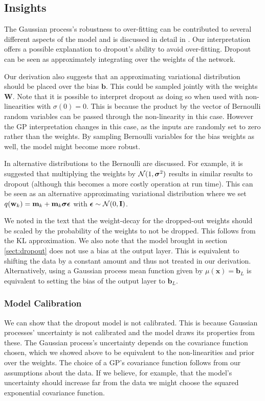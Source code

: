 \documentclass{article} %
\newcommand{\N}{\mathcal{N}}
\newcommand{\x}{\mathbf{x}}
\newcommand{\Bb}{\mathbf{b}}
\newcommand{\w}{\mathbf{w}}
\newcommand{\W}{\mathbf{W}}
\newcommand{\m}{\mathbf{m}}
\newcommand{\I}{\mathbf{I}}
\newcommand{\bepsilon}{\text{\boldmath$\epsilon$}}
\newcommand{\bsigma}{\text{\boldmath$\sigma$}}
\theoremstyle{definition}
\begin{document}
\subsection{Insights}
The Gaussian process's robustness to over-fitting can be contributed to several different aspects of the model and is discussed in detail in \citep{Rasmussen2005Gaussian}. 
Our interpretation offers a possible explanation to dropout's ability to avoid over-fitting. Dropout can be seen as approximately integrating over the weights of the network.

Our derivation also suggests that an approximating variational distribution should be placed over the bias $\Bb$. This could be sampled jointly with the weights $\W$. Note that it is possible to interpret dropout as doing so when used with non-linearities with $\sigma(0)=0$. This is because the product by the vector of Bernoulli random variables can be passed through the non-linearity in this case. However the GP interpretation changes in this case, as the inputs are randomly set to zero rather than the weights. By sampling Bernoulli variables for the bias weights as well, the model might become more robust.

In \citep{srivastava2014dropout} alternative distributions to the Bernoulli are discussed. For example, it is suggested that multiplying the weights by $\N(1,\bsigma^2)$ results in similar results to dropout (although this becomes a more costly operation at run time). This can be seen as an alternative approximating variational distribution where we set $q(\w_k) = \m_k + \m_k \bsigma \bepsilon$ with $\bepsilon \sim \N(0, \I)$.

We noted in the text that the weight-decay for the dropped-out weights should be scaled by the probability of the weights to not be dropped. This follows from the KL approximation. 
We also note that the model brought in section \ref{sect:dropout} does not use a bias at the output layer. This is equivalent to shifting the data by a constant amount and thus not treated in our derivation. Alternatively, using a Gaussian process mean function given by $\mu(\x) = \Bb_L$ is equivalent to setting the bias of the output layer to $\Bb_L$.

\subsubsection{Model Calibration}
We can show that the dropout model is not calibrated. This is because Gaussian processes' uncertainty is not calibrated and the model draws its properties from these. The Gaussian process's uncertainty depends on the covariance function chosen, which we showed above to be equivalent to the non-linearities and prior over the weights. The choice of a GP's covariance function follows from our assumptions about the data. If we believe, for example, that the model's uncertainty should increase far from the data we might choose the squared exponential covariance function.
\end{document}
